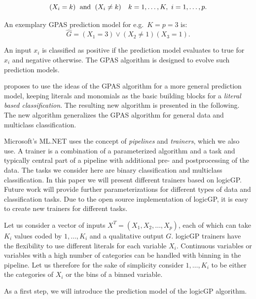 \documentclass[dvipsnames,format=sigconf,anonymous=false,review=false]{acmart}
\begin{document}
 \begin{equation}
  \left(X_i = k\right)\hspace*{1ex}\text{and}\hspace*{1ex}\left(X_i  \neq k\right)\hspace*{2ex} k=1,\ldots, K,\ i=1,\ldots, p. \label{eq:lit1}
 \end{equation}

 

An exemplary GPAS prediction model for e.g.\ $K=p=3$ is: 
\begin{equation}
  \hat{G} = (X_{1}=3) \vee (X_{2}\neq1)(X_{3}=1). \label{eq:gpasexample}
  \end{equation}

An input $x_i$ is classified as positive if the prediction model evaluates to true for $x_i$ and negative otherwise. The GPAS algorithm is designed to evolve such prediction models.

\citet{bioinformatics24} proposes to use the ideas of the GPAS algorithm for a more general prediction model, keeping literals and monomials as the basic building blocks for a \emph{literal based classification}. The resulting new algorithm is presented in the following. The new algorithm generalizes the GPAS algorithm for general data and multiclass classification. 

Microsoft's ML.NET uses the concept of \emph{pipelines} and \emph{trainers}, which we also use. A trainer is a combination of a parameterized algorithm and a task and typically central part of a pipeline with additional pre- and postprocessing of the data. The tasks we consider here are binary classification and multiclass classification. In this paper we will present different trainers based on logicGP. Future work will provide further parameterizations for different types of data and classification tasks. Due to the open source implementation of logicGP, it is easy to create new trainers for different tasks.  

Let us consider a vector of inputs $X^T=(X_1,X_2,\ldots,X_p)$, each of which can take $K_i$ values coded by $1, \ldots, K_i$ and a qualitative output $G$.
logicGP trainers have the flexibility to use different literals for each variable $X_i$. Continuous variables or variables with a high number of categories can be handled with binning in the pipeline. Let us therefore for the sake of simplicity consider $1, \ldots, K_i$ to be either the categories of $X_i$ or the bins of a binned variable.

As a first step, we will introduce the prediction model of the logicGP algorithm.
\end{document}
